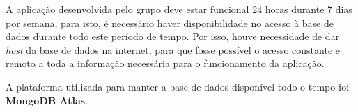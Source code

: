 A aplicação desenvolvida pelo grupo deve estar funcional 24 horas durante 7 dias por semana, para isto, é necessário haver disponibilidade no acesso à base de dados durante todo este período de tempo. Por isso, houve necessidade de dar \textit{host} da base de dados na internet, para que fosse possível o acesso constante e remoto a toda a informação necessária para o funcionamento da aplicação.

A plataforma utilizada para manter a base de dados disponível todo o tempo foi \textbf{MongoDB Atlas}.